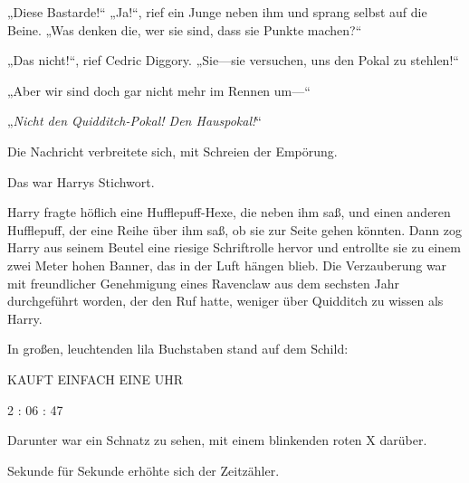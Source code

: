 „Diese Bastarde!“
„Ja!“, rief ein Junge neben ihm und sprang selbst auf die Beine. „Was denken die, wer sie sind, dass sie Punkte machen?“

„Das nicht!“, rief Cedric Diggory. „Sie—sie versuchen, uns den Pokal zu stehlen!“

„Aber wir sind doch gar nicht mehr im Rennen um—“

„\emph{Nicht den Quidditch-Pokal! Den Hauspokal!}“

Die Nachricht verbreitete sich, mit Schreien der Empörung.

Das war Harrys Stichwort.

Harry fragte höflich eine Hufflepuff-Hexe, die neben ihm saß, und einen anderen Hufflepuff, der eine Reihe über ihm saß, ob sie zur Seite gehen könnten. Dann zog Harry aus seinem Beutel eine riesige Schriftrolle hervor und entrollte sie zu einem zwei Meter hohen Banner, das in der Luft hängen blieb.
Die Verzauberung war mit freundlicher Genehmigung eines Ravenclaw aus dem sechsten Jahr durchgeführt worden, der den Ruf hatte, weniger über Quidditch zu wissen als Harry.

In großen, leuchtenden lila Buchstaben stand auf dem Schild:

\begin{center}
KAUFT EINFACH EINE UHR

2 : 06 : 47
\end{center}

Darunter war ein Schnatz zu sehen, mit einem blinkenden roten X darüber.

\later

Sekunde für Sekunde erhöhte sich der Zeitzähler.

